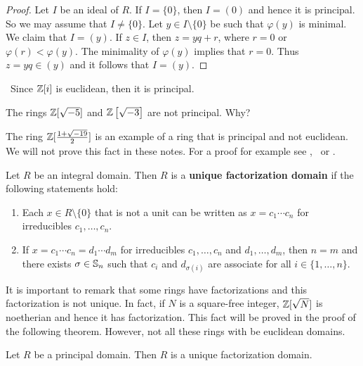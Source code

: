 \begin{proof}
	Let $I$ be an ideal of $R$. If $I=\{0\}$, then $I=(0)$ and hence 
	it is principal. So we may
	assume that $I\ne\{0\}$. Let $y\in I\setminus\{0\}$ be such that
	$\varphi(y)$ is minimal. We claim that $I=(y)$. 
	If $z\in I$, then $z=yq+r$, where $r=0$ or $\varphi(r)<\varphi(y)$. 
	The minimality of $\varphi(y)$ implies that $r=0$. Thus $z=yq\in (y)$ and 
	it follows that 
	$I=(y)$. 
\end{proof}

\begin{example}\
	Since $\mathbb{Z}[i]$ is euclidean, then it is principal.
\end{example}
 
\begin{example}
	The rings $\mathbb{Z}[\sqrt{-5}]$ and $\mathbb{Z}\left[\sqrt{-3}\right]$ are
	not principal. Why?
\end{example}

The ring $\mathbb{Z}[\frac{1+\sqrt{-19}}{2}]$ is an 
example of a ring that is principal and not euclidean. We will not prove this
fact in these notes. For a proof 
for example see \cite{MR967349}, \cite{MR3665445} or \cite{MR314831}.


\begin{definition}
	Let $R$ be an integral domain. Then $R$ is a 
	\textbf{unique factorization domain}
	if the following statements hold:
	\begin{enumerate}
	\item Each $x\in R\setminus\{0\}$ that is not a unit can be written as $x=c_1\cdots c_n$ for irreducibles $c_1,\dots,c_n$. 
	\item If $x=c_1\cdots c_n=d_1\cdots d_m$ for irreducibles $c_1,\dots,c_n$ and $d_1,\dots,d_m$, then $n=m$ and there exists $\sigma\in\mathbb{S}_n$ such that $c_i$ and $d_{\sigma(i)}$ are
		associate for all $i\in\{1,\dots,n\}$. 
	\end{enumerate}
\end{definition}

It is important to remark that some rings 
have factorizations and this factorization is not unique. 
In fact, if $N$ is a square-free integer, $\mathbb{Z}[\sqrt{N}]$ is noetherian and hence it   
has factorization. This fact will be proved in the proof of the following theorem. 
However, not all these rings with be euclidean domains. 

\begin{theorem}
	Let $R$ be a principal domain. 
	Then $R$ is a unique factorization domain.
\end{theorem}

